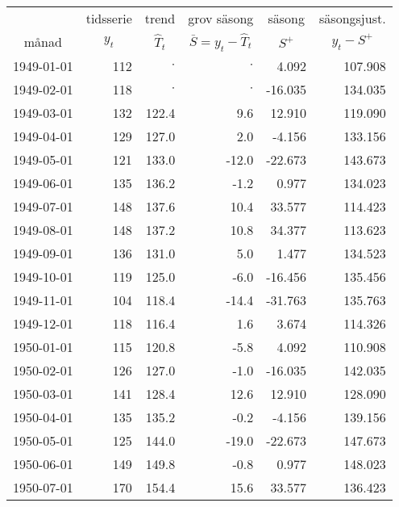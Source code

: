 \begin{tabular}{l|rrrrr}
\toprule 
  & \multicolumn{1}{c}{tidsserie} & \multicolumn{1}{c}{trend} & \multicolumn{1}{c}{grov säsong} & \multicolumn{1}{c}{säsong} & \multicolumn{1}{c}{säsongsjust.} \\
\multicolumn{1}{c}{månad} & \multicolumn{1}{c}{$y_t$} & \multicolumn{1}{c}{$ \hat{T}_t$} & \multicolumn{1}{c}{$ \bar S = y_t - \hat{T}_t$} & \multicolumn{1}{c}{$ S^{+} $} & \multicolumn{1}{c}{$ y_t - S^{+} $} \\
\hline 
1949-01-01 & 112 & $ \cdot $ & $ \cdot $ & 4.092 & 107.908 \\
1949-02-01 & 118 & $ \cdot $ & $ \cdot $ & -16.035 & 134.035 \\
1949-03-01 & \cellcolor{lorange}132 & 122.4 & \cellcolor{lblue}9.6 & \cellcolor{blue}12.910 & 119.090 \\
1949-04-01 & \cellcolor{lorange}129 & 127.0 & 2.0 & -4.156 & 133.156 \\
1949-05-01 & \cellcolor{lorange}121 & \cellcolor{orange}133.0 & -12.0 & -22.673 & 143.673 \\
1949-06-01 & \cellcolor{lorange}135 & 136.2 & -1.2 & 0.977 & 134.023 \\
1949-07-01 & \cellcolor{lorange}148 & 137.6 & 10.4 & 33.577 & 114.423 \\
1949-08-01 & 148 & 137.2 & 10.8 & 34.377 & 113.623 \\
1949-09-01 & 136 & 131.0 & 5.0 & 1.477 & 134.523 \\
1949-10-01 & \cellcolor{lorange}119 & 125.0 & -6.0 & -16.456 & 135.456 \\
1949-11-01 & \cellcolor{lorange}104 & 118.4 & -14.4 & -31.763 & 135.763 \\
1949-12-01 & \cellcolor{lorange}118 & \cellcolor{orange}116.4 & 1.6 & 3.674 & 114.326 \\
1950-01-01 & \cellcolor{lorange}115 & 120.8 & -5.8 & 4.092 & 110.908 \\
1950-02-01 & \cellcolor{lorange}126 & 127.0 & -1.0 & -16.035 & 142.035 \\
1950-03-01 & 141 & 128.4 & \cellcolor{lblue}12.6 & \cellcolor{blue}12.910 & 128.090 \\
1950-04-01 & 135 & 135.2 & -0.2 & -4.156 & 139.156 \\
1950-05-01 & 125 & 144.0 & -19.0 & -22.673 & 147.673 \\
1950-06-01 & 149 & 149.8 & -0.8 & 0.977 & 148.023 \\
1950-07-01 & 170 & 154.4 & 15.6 & 33.577 & 136.423 \\

\end{tabular}
